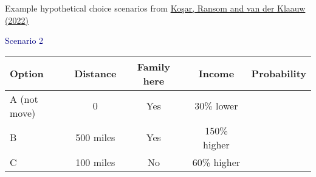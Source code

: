 \documentclass[aspectratio=169]{beamer}
\begin{document}
\begin{frame}

Example hypothetical choice scenarios from \href{https://www.sciencedirect.com/science/article/abs/pii/S0304407621000415}{Ko\c{s}ar, Ransom and van der Klaauw (2022)}

\bigskip


\bigskip


\end{frame}

\begin{frame}

\textcolor{navy}{Scenario 2}

\begin{table}[h]
\centering
\begin{tabular}{lcccc}
\toprule
Option & Distance & Family here & Income & Probability \\
\midrule
A (not move) & 0 & Yes & 30\% lower & \\
B & 500 miles & Yes & 150\% higher & \\
C & 100 miles & No & 60\% higher & \\
\bottomrule
\end{tabular}
\end{table}

\end{frame}
\end{document}
